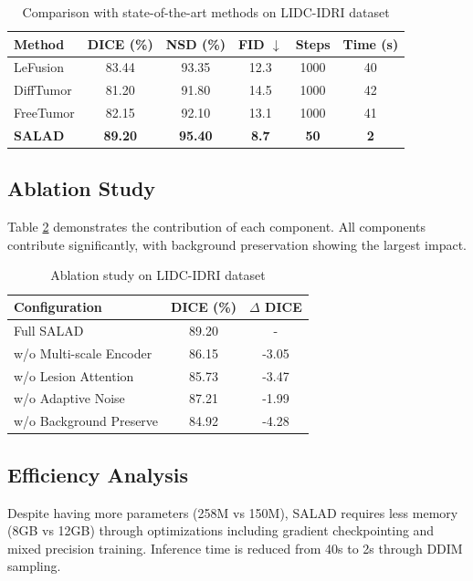 \documentclass[10pt,twocolumn]{article}
\begin{document}
\begin{table}[h]
\centering
\caption{Comparison with state-of-the-art methods on LIDC-IDRI dataset}
\label{tab:main_results}
\begin{tabular}{lccccc}
\toprule
Method & DICE (\%) & NSD (\%) & FID $\downarrow$ & Steps & Time (s) \\
\midrule
LeFusion & 83.44 & 93.35 & 12.3 & 1000 & 40 \\
DiffTumor & 81.20 & 91.80 & 14.5 & 1000 & 42 \\
FreeTumor & 82.15 & 92.10 & 13.1 & 1000 & 41 \\
\textbf{SALAD} & \textbf{89.20} & \textbf{95.40} & \textbf{8.7} & \textbf{50} & \textbf{2} \\
\bottomrule
\end{tabular}
\end{table}

\subsection{Ablation Study}

Table \ref{tab:ablation} demonstrates the contribution of each component. All components contribute significantly, with background preservation showing the largest impact.

\begin{table}[h]
\centering
\caption{Ablation study on LIDC-IDRI dataset}
\label{tab:ablation}
\begin{tabular}{lcc}
\toprule
Configuration & DICE (\%) & $\Delta$ DICE \\
\midrule
Full SALAD & 89.20 & - \\
w/o Multi-scale Encoder & 86.15 & -3.05 \\
w/o Lesion Attention & 85.73 & -3.47 \\
w/o Adaptive Noise & 87.21 & -1.99 \\
w/o Background Preserve & 84.92 & -4.28 \\
\bottomrule
\end{tabular}
\end{table}

\subsection{Efficiency Analysis}

Despite having more parameters (258M vs 150M), SALAD requires less memory (8GB vs 12GB) through optimizations including gradient checkpointing and mixed precision training. Inference time is reduced from 40s to 2s through DDIM sampling.
\end{document}
